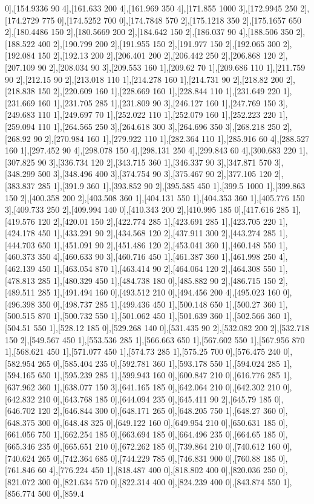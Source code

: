 {0],[154.9336 90 4],[161.633 200 4],[161.969 350 4],[171.855 1000 3],[172.9945 250 2],[174.2729 775 0],[174.5252 700 0],[174.7848 570 2],[175.1218 350 2],[175.1657 650 2],[180.4486 150 2],[180.5669 200 2],[184.642 150 2],[186.037 90 4],[188.506 350 2],[188.522 400 2],[190.799 200 2],[191.955 150 2],[191.977 150 2],[192.065 300 2],[192.084 150 2],[192.13 200 2],[206.401 200 2],[206.442 250 2],[206.868 120 2],[207.109 90 2],[208.034 90 3],[209.553 160 1],[209.62 70 1],[209.686 110 1],[211.759 90 2],[212.15 90 2],[213.018 110 1],[214.278 160 1],[214.731 90 2],[218.82 200 2],[218.838 150 2],[220.609 160 1],[228.669 160 1],[228.844 110 1],[231.649 220 1],[231.669 160 1],[231.705 285 1],[231.809 90 3],[246.127 160 1],[247.769 150 3],[249.683 110 1],[249.697 70 1],[252.022 110 1],[252.079 160 1],[252.223 220 1],[259.094 110 1],[264.565 250 3],[264.618 300 3],[264.696 350 3],[268.218 250 2],[268.92 90 2],[270.984 160 1],[279.922 110 1],[282.364 110 1],[285.916 60 4],[288.527 160 1],[297.452 90 4],[298.078 150 4],[298.131 250 4],[299.843 60 4],[300.683 220 1],[307.825 90 3],[336.734 120 2],[343.715 360 1],[346.337 90 3],[347.871 570 3],[348.299 500 3],[348.496 400 3],[374.754 90 3],[375.467 90 2],[377.105 120 2],[383.837 285 1],[391.9 360 1],[393.852 90 2],[395.585 450 1],[399.5 1000 1],[399.863 150 2],[400.358 200 2],[403.508 360 1],[404.131 550 1],[404.353 360 1],[405.776 150 3],[409.733 250 2],[409.994 140 0],[410.343 200 2],[410.995 185 0],[417.616 285 1],[419.576 120 2],[420.01 150 2],[422.774 285 1],[423.691 285 1],[423.705 220 1],[424.178 450 1],[433.291 90 2],[434.568 120 2],[437.911 300 2],[443.274 285 1],[444.703 650 1],[451.091 90 2],[451.486 120 2],[453.041 360 1],[460.148 550 1],[460.373 350 4],[460.633 90 3],[460.716 450 1],[461.387 360 1],[461.998 250 4],[462.139 450 1],[463.054 870 1],[463.414 90 2],[464.064 120 2],[464.308 550 1],[478.813 285 1],[480.329 450 1],[484.738 180 0],[485.882 90 2],[486.715 150 2],[489.511 285 1],[491.494 160 0],[493.512 210 0],[494.456 200 4],[495.023 160 0],[496.398 350 0],[498.737 285 1],[499.436 450 1],[500.148 650 1],[500.27 360 1],[500.515 870 1],[500.732 550 1],[501.062 450 1],[501.639 360 1],[502.566 360 1],[504.51 550 1],[528.12 185 0],[529.268 140 0],[531.435 90 2],[532.082 200 2],[532.718 150 2],[549.567 450 1],[553.536 285 1],[566.663 650 1],[567.602 550 1],[567.956 870 1],[568.621 450 1],[571.077 450 1],[574.73 285 1],[575.25 700 0],[576.475 240 0],[582.954 265 0],[585.404 235 0],[592.781 360 1],[593.178 550 1],[594.024 285 1],[594.165 650 1],[595.239 285 1],[599.943 160 0],[600.847 210 0],[616.776 285 1],[637.962 360 1],[638.077 150 3],[641.165 185 0],[642.064 210 0],[642.302 210 0],[642.832 210 0],[643.768 185 0],[644.094 235 0],[645.411 90 2],[645.79 185 0],[646.702 120 2],[646.844 300 0],[648.171 265 0],[648.205 750 1],[648.27 360 0],[648.375 300 0],[648.48 325 0],[649.122 160 0],[649.954 210 0],[650.631 185 0],[661.056 750 1],[662.254 185 0],[663.694 185 0],[664.496 235 0],[664.65 185 0],[665.346 235 0],[665.651 210 0],[672.262 185 0],[739.864 210 0],[740.612 160 0],[740.624 265 0],[742.364 685 0],[744.229 785 0],[746.831 900 0],[760.88 185 0],[761.846 60 4],[776.224 450 1],[818.487 400 0],[818.802 400 0],[820.036 250 0],[821.072 300 0],[821.634 570 0],[822.314 400 0],[824.239 400 0],[843.874 550 1],[856.774 500 0],[859.4 }

